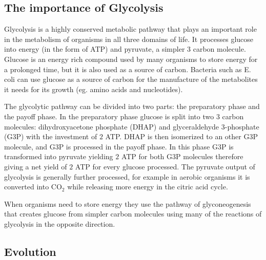 \documentclass[a4paper,12pt]{article}
\begin{document}
\subsection{The importance of Glycolysis}
\label{sub:importance_of_glycolysis}

Glycolysis is a highly conserved metabolic pathway that plays an important role in the metabolism of organisms in all three domains of life. It processes glucose into energy (in the form of ATP) and pyruvate, a simpler 3 carbon molecule. Glucose is an energy rich compound used by many organisms to store energy for a prolonged time, but it is also used as a source of carbon. Bacteria such as E. coli can use glucose as a source of carbon for the manufacture of the metabolites it needs for its growth (eg. amino acids and nucleotides). \cite[]{principlesofbio} 

The glycolytic pathway can be divided into two parts: the preparatory phase and the payoff phase. In the preparatory phase glucose is split into two $3$ carbon molecules: dihydroxyacetone phosphate (DHAP) and glyceraldehyde 3-phosphate (G3P) with the investment of $2$ ATP. DHAP is then isomerized to an other G3P molecule, and G3P is processed in the payoff phase. In this phase G3P is transformed into pyruvate yielding $2$ ATP for both G3P molecules therefore giving a net yield of $2$ ATP for every glucose processed. The pyruvate output of glycolysis is generally further processed, for example in aerobic organisms it is converted into CO$_2$ while releasing more energy in the citric acid cycle. 

When organisms need to store energy they use the pathway of glyconeogenesis that creates glucose from simpler carbon molecules using many of the reactions of glycolysis in the opposite direction. %
	
	\subsection{Evolution}\label{chap:evolution}
	
\end{document}

